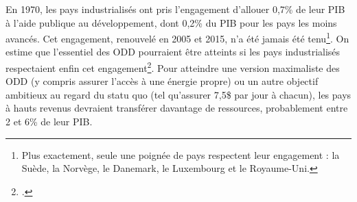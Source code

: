 \documentclass[a5paper,french]{memoir}
\begin{document}
En 1970, les pays industrialisés ont pris l'engagement d'allouer 0,7\% de leur PIB à l'aide publique au développement, dont 0,2\% du PIB pour les pays les moins avancés. Cet engagement, renouvelé en 2005 et 2015, n'a été jamais été tenu\footnote{Plus exactement, seule une poignée de pays respectent leur engagement : la Suède, la Norvège, le Danemark, le Luxembourg et le Royaume-Uni.}. %
On estime que l'essentiel des ODD pourraient être atteints si les pays industrialisés respectaient enfin cet engagement\footnote{\citet{sdsn_sdg_2019}.}. Pour atteindre une version maximaliste des ODD (y compris assurer l'accès à une énergie propre) ou un autre objectif ambitieux au regard du statu quo (tel qu'assurer 7,5\$ par jour à chacun), les pays à hauts revenus devraient transférer davantage de ressources, probablement entre 2 et 6\% de leur PIB. %

\end{document}
